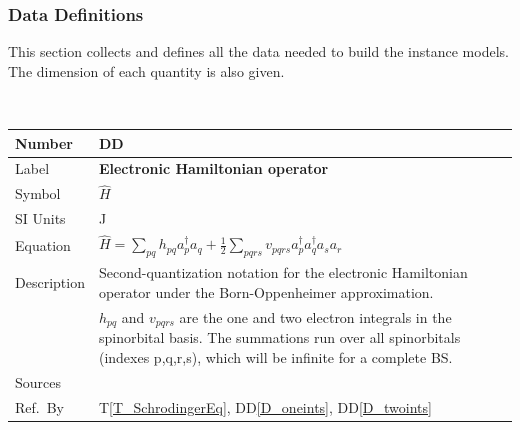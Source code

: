 \documentclass[12pt]{article}
\newcommand{\colAwidth}{0.13\textwidth}
\newcommand{\colBwidth}{0.82\textwidth}
\newcounter{defnum} %
\newcounter{datadefnum} %
\newcommand{\ddref}[1]{DD\ref{#1}}
\newcommand{\tref}[1]{T\ref{#1}}
\begin{document}
\subsubsection{Data Definitions}\label{sec_datadef}

This section collects and defines all the data needed to build the instance
models. The dimension of each quantity is also given.  

~\newline

\noindent
\begin{minipage}{\textwidth}
	\renewcommand*{\arraystretch}{1.5}
	\begin{tabular}{| p{\colAwidth} | p{\colBwidth}|}
		\hline
		\rowcolor[gray]{0.9}
		Number& DD{datadefnum}\thedatadefnum 
		\label{D_hamiltonian}\\
		\hline
		Label& \bf Electronic Hamiltonian operator\\
		\hline
		Symbol & $\hat{H}$\\
		\hline
		SI Units & \si{\joule}\\
		\hline
		Equation&$\hat{H} = \sum_{pq} h_{pq} a^{\dagger}_p a_q + \frac{1}{2} 
		\sum_{pqrs} v_{pqrs} a^{\dagger}_p a^{\dagger}_q a_s a_r$\\
		\hline
		Description & Second-quantization notation for the electronic 
		Hamiltonian operator under the Born-Oppenheimer approximation.
		\\
		&$h_{pq} $ and $ v_{pqrs}$ are the one and two electron integrals in 
		the spinorbital basis. The summations run over all spinorbitals 
		(indexes p,q,r,s), which will be infinite for a complete BS.\\
		\hline
		Sources& \cite{szabo-ostlund} \\
		\hline
		Ref.\ By & \tref{T_SchrodingerEq}, \ddref{D_oneints}, 
		\ddref{D_twoints}\\
		\hline
	\end{tabular}
\end{minipage}\\

~\newline
\end{document}
